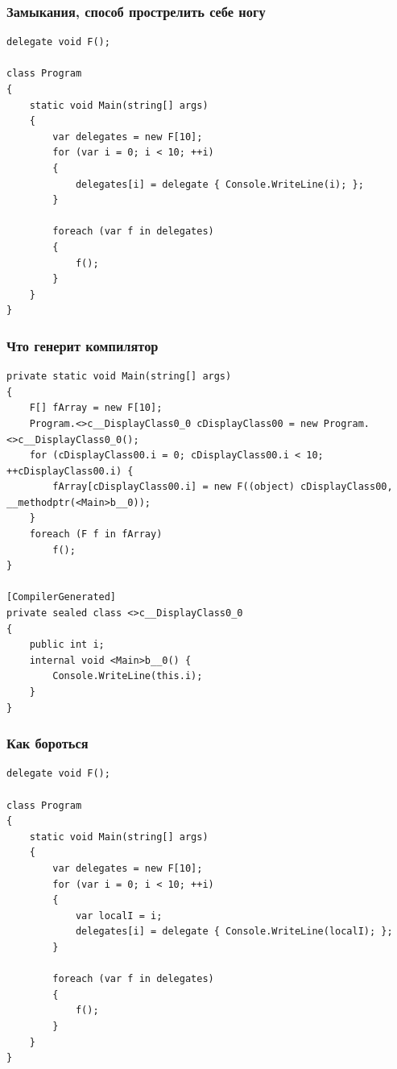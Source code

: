 \documentclass[xetex,mathserif,serif]{beamer}
\begin{document}
    \begin{frame}[fragile]
        \frametitle{Замыкания, способ прострелить себе ногу}
        \begin{small}
            \begin{verbatim}
delegate void F();

class Program
{
    static void Main(string[] args)
    {
        var delegates = new F[10];
        for (var i = 0; i < 10; ++i)
        {
            delegates[i] = delegate { Console.WriteLine(i); };
        }

        foreach (var f in delegates)
        {
            f();
        }
    }
}
            \end{verbatim}
        \end{small}
    \end{frame}

    \begin{frame}[fragile]
        \frametitle{Что генерит компилятор}
        \begin{scriptsize}
            \begin{verbatim}
private static void Main(string[] args)
{
    F[] fArray = new F[10];
    Program.<>c__DisplayClass0_0 cDisplayClass00 = new Program.<>c__DisplayClass0_0();
    for (cDisplayClass00.i = 0; cDisplayClass00.i < 10; ++cDisplayClass00.i) {
        fArray[cDisplayClass00.i] = new F((object) cDisplayClass00, __methodptr(<Main>b__0));
    }
    foreach (F f in fArray)
        f();
}

[CompilerGenerated]
private sealed class <>c__DisplayClass0_0
{
    public int i;
    internal void <Main>b__0() {
        Console.WriteLine(this.i);
    }
}
            \end{verbatim}
        \end{scriptsize}
    \end{frame}

    \begin{frame}[fragile]
        \frametitle{Как бороться}
        \begin{small}
            \begin{verbatim}
delegate void F();

class Program
{
    static void Main(string[] args)
    {
        var delegates = new F[10];
        for (var i = 0; i < 10; ++i)
        {
            var localI = i;
            delegates[i] = delegate { Console.WriteLine(localI); };
        }

        foreach (var f in delegates)
        {
            f();
        }
    }
}
            \end{verbatim}
        \end{small}
    \end{frame}
\end{document}
